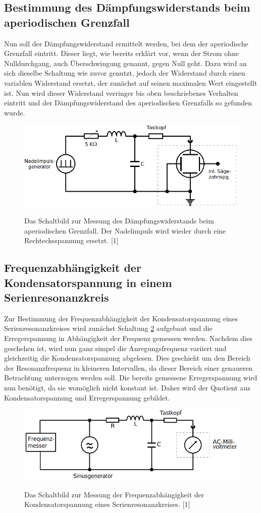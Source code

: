 \documentclass[titlepage = firstcover]{scrartcl}
\begin{document}
        \subsection{Bestimmung des Dämpfungswiderstands beim aperiodischen Grenzfall}
            Nun soll der Dämpfungswiderstand ermittelt werden, bei dem der aperiodische Grenzfall eintritt. Dieser liegt, wie bereits erklärt vor, wenn der
            Strom ohne Nulldurchgang, auch Überschwingung genannt, gegen Null geht. Dazu wird an sich dieselbe Schaltung wie zuvor genutzt, jedoch der 
            Widerstand durch einen variablen Widerstand ersetzt, der zunächst auf seinen maximalen Wert eingestellt ist. Nun wird dieser Widerstand verringer
            bis oben beschriebenes Verhalten eintritt und der Dämpfungswiderstand des aperiodischen Grenzfalls so gefunden wurde.
            \begin{figure}[h]
                \centering
                \caption{Das Schaltbild zur Messung des Dämpfungswiderstands beim aperiodischen Grenzfall. Der Nadelimpuls wird wieder durch eine Rechtecksspannung ersetzt. [1]}
                \includegraphics[width = 0.4\linewidth]{MessungB.png}
                \label{fig:MessungB}
              \end{figure}
              \FloatBarrier

        \subsection{Frequenzabhängigkeit der Kondensatorspannung in einem Serienresonanzkreis}
              Zur Bestimmung der Frequenzabhängigkeit der Kondensatorspannung eines Serienresonanzkreises wird zunächst Schaltung \ref{fig:MessungC} aufgebaut und die Erregerspannung in Abhängigkeit der Frequenz gemessen werden. Nachdem dies geschehen ist, wird nun ganz simpel die Anregungsfrequenz variiert und gleichzeitig die Kondensatorspannung abgelesen. Dies geschieht um den Bereich der Resonanzfrequenz in kleineren Intervallen, da dieser Bereich einer genaueren Betrachtung unterzogen werden soll. Die bereits gemessene Erregerspannung wird nun benötigt, da sie womöglich nicht konstant ist. Daher wird der Quotient aus Kondensatorspannung und Erregerspannung gebildet. 
              \begin{figure}[h]
                \centering
                \caption{Das Schaltbild zur Messung der Frequenzabhängigkeit der Kondensatorspannung eines Serienresonanzkreises. [1]}
                \includegraphics[width = 0.4\linewidth]{MessungC.png}
                \label{fig:MessungC}
              \end{figure}
              \FloatBarrier
\end{document}
